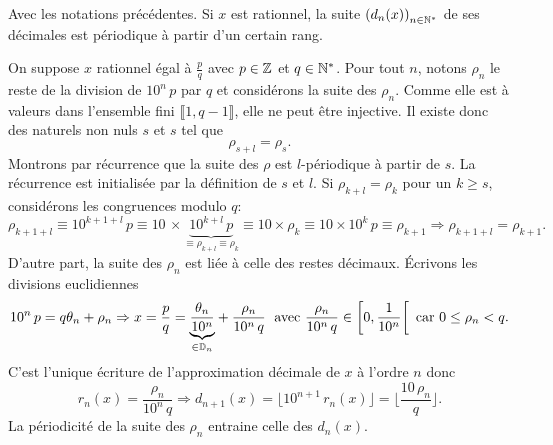 \begin{propn}
 Avec les notations précédentes. Si $x$ est rationnel, la suite $\left( d_n(x) \right)_{n \in \mathbb{N}^*}$ de ses décimales est périodique à partir d'un certain rang. 
\end{propn}
\begin{demo}
 On suppose $x$ rationnel égal à $\frac{p}{q}$ avec $p\in \mathbb{Z}$ et $q\in \mathbb{N}^*$.\newline
 Pour tout $n$, notons $\rho_n$ le reste de la division de $10^n\,p$ par $q$ et considérons la suite des $\rho_n$.\newline
 Comme elle est à valeurs dans l'ensemble fini $\llbracket 1, q-1\rrbracket$, elle ne peut être injective. Il existe donc des naturels non nuls $s$ et $s$ tel que 
 \[
  \rho_{s + l} = \rho_s .
 \]
Montrons par récurrence que la suite des $\rho$ est $l$-périodique à partir de $s$. La récurrence est initialisée par la définition de $s$ et $l$. Si $\rho_{k + l} = \rho_k$ pour un $k \geq s$, considérons les congruences modulo $q$:
\[
 \rho_{k + 1 + l} \equiv 10^{k+1+l}\, p \equiv 10\, \times \underset{ \equiv \rho_{k + l} \equiv \rho_k}{\underbrace{10^{k+l}\, p}} 
 \equiv  10\times \rho_{k} \equiv 10\times 10^k\, p \equiv \rho_{k+1}
 \Rightarrow \rho_{k + 1 + l} = \rho_{k + 1}.
\]
D'autre part, la suite des $\rho_n$ est liée à celle des restes décimaux. \'Ecrivons les divisions euclidiennes
\[
 10^n\,p = q \theta_n + \rho_n
 \Rightarrow
 x = \frac{p}{q} = \underset{\in \mathbb{D}_n}{\underbrace{\frac{\theta_n}{10^n}}} + \frac{\rho_n}{10^n\, q}\; \text{ avec }
 \frac{\rho_n}{10^n\, q} \in \left[ 0, \frac{1}{10^n}\right[ \text{ car } 0 \leq \rho_n < q .
\]
C'est l'unique écriture de l'approximation décimale de $x$ à l'ordre $n$ donc
\[
 r_n(x) = \frac{\rho_n}{10^n\, q}
 \Rightarrow d_{n+1}(x) = \lfloor 10^{n+1}\,r_n(x) \rfloor = \lfloor \frac{10\, \rho_n}{q}\rfloor.
\]
La périodicité de la suite des $\rho_n$ entraine celle des $d_n(x)$.
\end{demo}


